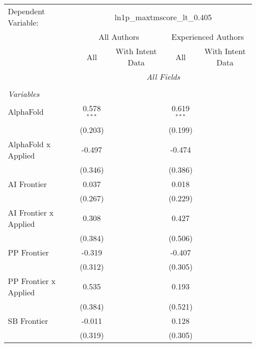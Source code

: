 \begingroup
\centering
\begin{tabular}{lcccccc}
   \tabularnewline \midrule \midrule
   Dependent Variable: & \multicolumn{6}{c}{ln1p\_maxtmscore\_lt\_0.405}\\
 & \multicolumn{3}{c}{All Authors} & \multicolumn{3}{c}{Experienced Authors} \\
\cmidrule(lr){2-4} \cmidrule(lr){5-7}
 & \multicolumn{1}{c}{All} & \multicolumn{2}{c}{With Intent Data} & \multicolumn{1}{c}{All} & \multicolumn{2}{c}{With Intent Data} \\
\cmidrule(lr){2-2} \cmidrule(lr){3-4} \cmidrule(lr){5-5} \cmidrule(lr){6-7}
 & \multicolumn{6}{c}{\textit{All Fields}} \\ \\
   \emph{Variables}\\
   AlphaFold             & 0.578$^{***}$ &        &        & 0.619$^{***}$ &        &   \\   
                         & (0.203)       &        &        & (0.199)       &        &   \\   
   AlphaFold x Applied   & -0.497        &        &        & -0.474        &        &   \\   
                         & (0.346)       &        &        & (0.386)       &        &   \\   
   AI Frontier           & 0.037         &        &        & 0.018         &        &   \\   
                         & (0.267)       &        &        & (0.229)       &        &   \\   
   AI Frontier x Applied & 0.308         &        &        & 0.427         &        &   \\   
                         & (0.384)       &        &        & (0.506)       &        &   \\   
   PP Frontier           & -0.319        &        &        & -0.407        &        &   \\   
                         & (0.312)       &        &        & (0.305)       &        &   \\   
   PP Frontier x Applied & 0.535         &        &        & 0.193         &        &   \\   
                         & (0.384)       &        &        & (0.521)       &        &   \\   
   SB Frontier           & -0.011        &        &        & 0.128         &        &   \\   
                         & (0.319)       &        &        & (0.305)       &        &   \\   

\end{tabular}

